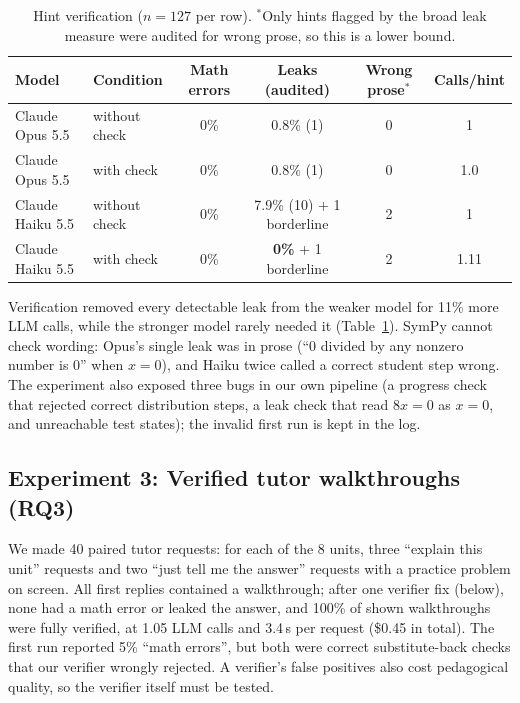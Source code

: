 \documentclass[11pt]{article}
\begin{document}
\begin{table}[ht]
\centering\small
\begin{tabular}{@{}llcccc@{}}
\toprule
Model & Condition & Math errors & Leaks (audited) & Wrong prose$^{*}$ & Calls/hint \\
\midrule
Claude Opus 5.5 & without check & 0\% & 0.8\% (1) & 0 & 1 \\
Claude Opus 5.5 & with check & 0\% & 0.8\% (1) & 0 & 1.0 \\
Claude Haiku 5.5 & without check & 0\% & 7.9\% (10) + 1 borderline & 2 & 1 \\
Claude Haiku 5.5 & with check & 0\% & \textbf{0\%} + 1 borderline & 2 & 1.11 \\
\bottomrule
\end{tabular}
\caption{Hint verification ($n=127$ per row). $^{*}$Only hints flagged by the broad leak measure were audited for wrong prose, so this is a lower bound.}
\label{tab:exp2}
\end{table}

Verification removed every detectable leak from the weaker model for 11\% more LLM calls, while the stronger model rarely needed it (Table~\ref{tab:exp2}). SymPy cannot check wording: Opus's single leak was in prose (``0 divided by any nonzero number is 0'' when $x=0$), and Haiku twice called a correct student step wrong. The experiment also exposed three bugs in our own pipeline (a progress check that rejected correct distribution steps, a leak check that read $8x=0$ as $x=0$, and unreachable test states); the invalid first run is kept in the log.

\subsection{Experiment 3: Verified tutor walkthroughs (RQ3)}
We made 40 paired tutor requests: for each of the 8 units, three ``explain this unit'' requests and two ``just tell me the answer'' requests with a practice problem on screen. All first replies contained a walkthrough; after one verifier fix (below), none had a math error or leaked the answer, and 100\% of shown walkthroughs were fully verified, at 1.05 LLM calls and 3.4\,s per request (\$0.45 in total). The first run reported 5\% ``math errors'', but both were correct substitute-back checks that our verifier wrongly rejected. A verifier's false positives also cost pedagogical quality, so the verifier itself must be tested.

\end{document}
